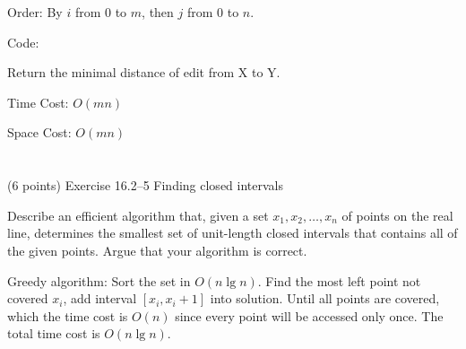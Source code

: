 \documentclass[paper=a4, fontsize=11pt]{scrartcl} %
\begin{document}
Order:
By $i$ from $0$ to $m$, then $j$ from $0$ to $n$.

Code:
\begin{algorithm}[H]
  \caption{Return the minimal distance of edit from X to Y.}
\end{algorithm}

Time Cost: $O(mn)$

Space Cost: $O(mn)$

\pagebreak

\section{}

\begin{fancyquotes}
  (6 points) Exercise 16.2--5 Finding closed intervals

  Describe an efficient algorithm that, given a set $x_1, x_2, \ldots,
  x_n$ of points on the real line, determines the smallest set of
  unit-length closed intervals that contains all of the given
  points. Argue that your algorithm is correct.
\end{fancyquotes}

Greedy algorithm:
Sort the set in $O(n\lg{n})$. Find the most left point not covered
$x_i$, add interval $[x_i,x_i+1]$ into solution. Until all points are
covered, which the time cost is $O(n)$ since every point will be
accessed only once. The total time cost is $O(n\lg{n})$.
\end{document}
